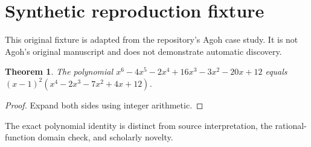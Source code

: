 \documentclass{article}
\newtheorem{theorem}{Theorem}
\begin{document}
\section{Synthetic reproduction fixture}
This original fixture is adapted from the repository's Agoh case study.
It is not Agoh's original manuscript and does not demonstrate automatic discovery.
\begin{theorem}\label{agoh:factor}
The polynomial $x^6-4x^5-2x^4+16x^3-3x^2-20x+12$
equals $(x-1)^2(x^4-2x^3-7x^2+4x+12)$.
\end{theorem}
\begin{proof}Expand both sides using integer arithmetic.\end{proof}
The exact polynomial identity is distinct from source interpretation,
the rational-function domain check, and scholarly novelty.
\end{document}

